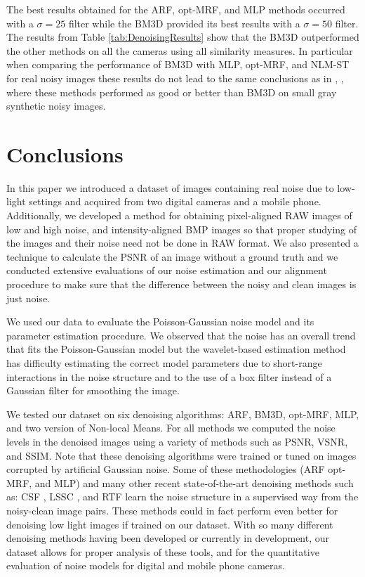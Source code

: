 \documentclass[review]{elsarticle}
\begin{document}
The best results obtained for the ARF, opt-MRF, and MLP methods occurred with a $\sigma = 25$ filter while the BM3D provided its best results with a $\sigma =50$ filter. The results from Table \ref{tab:DenoisingResults} show that the BM3D outperformed the other methods on all the cameras using all similarity measures. In particular when comparing the performance of BM3D with MLP, opt-MRF, and NLM-ST for real noisy images these results do not lead to the same conclusions as in \cite{NeuralNetworkCompete}, \cite{optMRF}, \cite{lu2015non} where these methods performed as good or better than BM3D on small gray synthetic noisy images. 

\section{Conclusions}
In this paper we introduced a dataset of images containing real noise due to low-light settings and acquired from two digital cameras and a mobile phone. Additionally, we developed a method for obtaining pixel-aligned RAW images of low and high noise, and intensity-aligned BMP images so that proper studying of the images and their noise need not be  done in RAW format. We also presented a technique to calculate the PSNR of an image without a ground truth and we conducted extensive evaluations of our noise estimation and our alignment procedure to make sure that the difference between the noisy and clean images is just noise.

We used our data to evaluate the Poisson-Gaussian noise model  \cite{Foi-Poisson} and its parameter estimation procedure. We observed that  the noise has an overall trend that fits the Poisson-Gaussian model but the wavelet-based estimation method has difficulty estimating the correct model parameters due to short-range interactions in the noise structure and to the use of a box filter instead of a Gaussian filter for smoothing the image.

We tested our dataset on six denoising algorithms: ARF, BM3D, opt-MRF, MLP, and two version of Non-local Means. For all methods we computed the noise levels in the denoised images using a variety of methods such as PSNR, VSNR, and SSIM. Note that these denoising algorithms were trained or tuned on images corrupted by artificial Gaussian noise. Some of these methodologies (ARF opt-MRF, and MLP) and many other recent state-of-the-art denoising methods such as: CSF \cite{Shrinkagefields}, LSSC \cite{mairal2009non}, and RTF \cite{Loss-specific} learn the noise structure in a supervised way from the noisy-clean image pairs. These methods could in fact perform even better for denoising low light images if trained on our dataset. With so many different denoising methods having been developed or currently in development, our dataset allows for proper analysis of these tools, and for the quantitative evaluation of noise models for digital and mobile phone cameras. 
\end{document}
